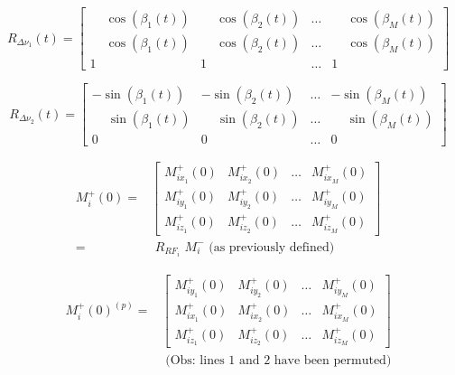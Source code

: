 \begin{equation}
    R_{\Delta \nu_1}(t)  = \begin{bmatrix} \phantom{-}\cos(\beta_{1}(t) ) & \phantom{-}\cos(\beta_{2}(t) ) & \dots & \phantom{-}\cos(\beta_{M}(t) ) \\
    \phantom{-}\cos(\beta_{1}(t) ) & \phantom{-}\cos(\beta_{2}(t) ) & \dots & \phantom{-}\cos(\beta_{M}(t) ) \\
    1    &        1   & \dots &  1
    \end{bmatrix}
\end{equation}

\begin{equation}
    R_{\Delta \nu_2}(t)  = \begin{bmatrix} -\sin(\beta_{1}(t) ) & -\sin(\beta_{2}(t) ) & \dots & -\sin(\beta_{M}(t) ) \\
    \phantom{-}\sin(\beta_{1}(t) ) & \phantom{-}\sin(\beta_{2}(t) ) & \dots & \phantom{-}\sin(\beta_{M}(t) ) \\
    0     &      0      & \dots &      0
    \end{bmatrix}
\end{equation}

\begin{equation}
\begin{split}
    M^{+}_i(0) = &
    \begin{bmatrix}
        M^{+}_{ix_1}(0) & M^{+}_{ix_2}(0) & \dots & M^{+}_{ix_M}(0) \\
        M^{+}_{iy_1}(0) & M^{+}_{iy_2}(0) & \dots & M^{+}_{iy_M}(0) \\
        M^{+}_{iz_1}(0) & M^{+}_{iz_2}(0) & \dots & M^{+}_{iz_M}(0)
    \end{bmatrix} \\
    = & \, \, R_{RF_i} \, \, M^{-}_i \text{ (as previously defined)}
\end{split}
\end{equation}

\begin{equation}
\begin{split}
    M^{+}_i(0)^{(p)} = &
    \begin{bmatrix}
        M^{+}_{iy_1}(0) & M^{+}_{iy_2}(0) & \dots & M^{+}_{iy_M}(0) \\
        M^{+}_{ix_1}(0) & M^{+}_{ix_2}(0) & \dots & M^{+}_{ix_M}(0) \\
        M^{+}_{iz_1}(0) & M^{+}_{iz_2}(0) & \dots & M^{+}_{iz_M}(0)
    \end{bmatrix} \\
    & \text{ (Obs: lines 1 and 2 have been permuted)}
\end{split}
\end{equation}

